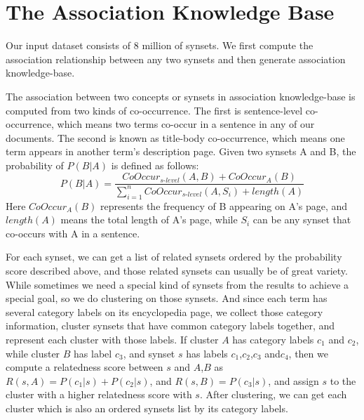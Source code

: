 \section{The Association Knowledge Base}
Our input dataset consists of 8 million of synsets. 
We first compute the association relationship between any two synsets and 
then generate association knowledge-base.

The association between two concepts or synsets in association knowledge-base is computed from two kinds of co-occurrence. The first is sentence-level co-occurrence, which means two terms co-occur in a sentence in any of our documents. The second is known as title-body co-occurrence, which means one term appears 
in another term's description page. Given two synsets A and B,
the probability of $P(B|A)$ is defined as follows:
\begin{equation}
P(B|A)=\frac{CoOccur_{s\textrm{-}level}(A,B)+CoOccur_A(B)}{\sum_{i=1}^nCoOccur_{s\textrm{-}level}(A,S_i)+length(A)}
\end{equation}
Here $CoOccur_A(B)$ represents the frequency of B appearing on A's page, and $length(A)$ means the total length of A's page, while $S_i$ can be any synset that co-occurs with A in a sentence.

For each synset, we can get a list of related synsets ordered by the probability score described above, and those related synsets can usually be of great variety. While sometimes we need a special kind of synsets from the results to achieve a special goal, so we do clustering on those synsets. And since each term has several category labels on its encyclopedia page, we collect those category information, cluster synsets that have common category labels together, and represent each cluster with those labels. If cluster $A$ has category labels $c_1$ and $c_2$, while cluster $B$ has label $c_3$, and synset $s$ has labels $c_1$,$c_2$,$c_3$ and$c_4$, then we compute a relatedness score between $s$ and $A$,$B$ as $R(s,A)=P(c_1|s)+P(c_2|s)$, and $R(s,B)=P(c_3|s)$, and assign $s$ to the cluster with a higher relatedness score with $s$. After clustering, we can get each cluster which is also an ordered synsets list by its category labels.

